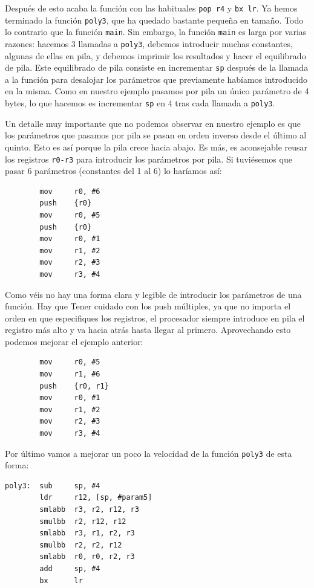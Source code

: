 Después de esto acaba la función con las habituales {\tt pop {r4}} y
{\tt bx lr}. Ya hemos terminado la función {\tt poly3}, que ha quedado
bastante pequeña en tamaño. Todo lo contrario que la función {\tt main}. Sin
embargo, la función {\tt main} es larga por varias razones: hacemos 3 llamadas
a {\tt poly3}, debemos introducir muchas constantes, algunas de ellas
en pila, y debemos imprimir los resultados y hacer el equilibrado de pila. Este
equilibrado de pila consiste en incrementar {\tt sp} después de la
llamada a la función para desalojar los parámetros que previamente habíamos
introducido en la misma. Como en nuestro ejemplo pasamos por pila un
único parámetro de 4 bytes, lo que hacemos es incrementar {\tt sp} en 4 tras
cada llamada a {\tt poly3}.

Un detalle muy importante que no podemos observar en nuestro ejemplo es que los
parámetros que pasamos por pila se pasan en orden inverso desde el último
al quinto. Esto es así porque la pila crece hacia abajo. Es más, es
aconsejable reusar los registros {\tt r0-r3} para introducir los
parámetros por pila. Si tuviésemos que pasar 6 parámetros (constantes del
1 al 6) lo haríamos así:

\begin{lstlisting}
        mov     r0, #6
        push    {r0}
        mov     r0, #5
        push    {r0}
        mov     r0, #1
        mov     r1, #2
        mov     r2, #3
        mov     r3, #4
\end{lstlisting}

Como véis no hay una forma clara y legible de introducir los parámetros
de una función. Hay que Tener cuidado con los push múltiples, ya que no importa el orden
en que especifiques los registros, el procesador siempre introduce en pila
el registro más alto y va hacia atrás hasta llegar al primero. Aprovechando
esto podemos mejorar el ejemplo anterior:

\begin{lstlisting}
        mov     r0, #5
        mov     r1, #6
        push    {r0, r1}
        mov     r0, #1
        mov     r1, #2
        mov     r2, #3
        mov     r3, #4
\end{lstlisting}

Por último vamos a mejorar un poco la velocidad de la función {\tt poly3} de
esta forma:

\begin{lstlisting}[caption={Parte de subrut6.s},label={lst:codigoPract3_8}]
poly3:  sub     sp, #4
        ldr     r12, [sp, #param5]
        smlabb  r3, r2, r12, r3
        smulbb  r2, r12, r12
        smlabb  r3, r1, r2, r3
        smulbb  r2, r2, r12
        smlabb  r0, r0, r2, r3
        add     sp, #4
        bx      lr
\end{lstlisting}

